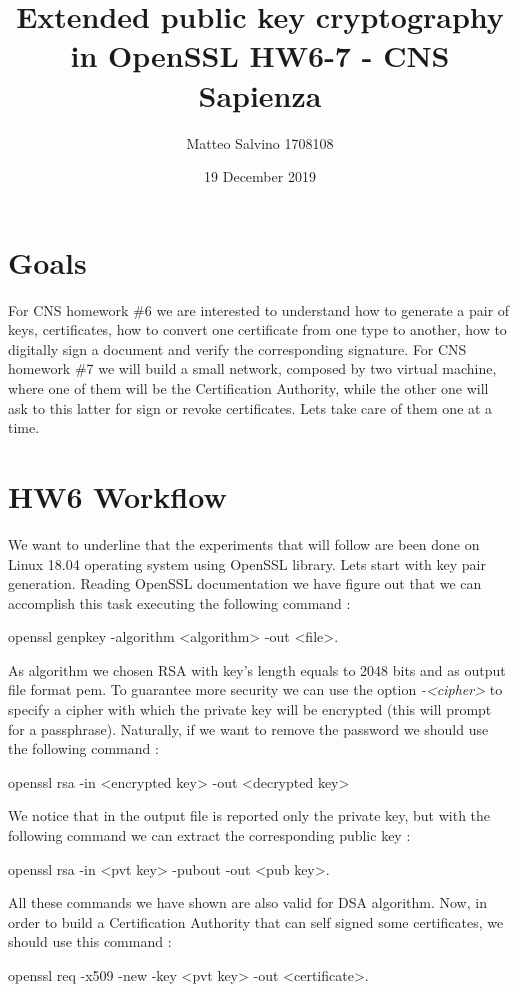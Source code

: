 \documentclass[11pt]{article}
\title{Extended public key cryptography in OpenSSL \large HW6-7 - CNS Sapienza}
\author{Matteo Salvino 1708108}
\date{19 December 2019}
\begin{document}
\maketitle
\section{Goals}
For CNS homework \#6 we are interested to understand how to generate a pair of keys, certificates, how to convert one certificate from one type to another, how to digitally sign a document and verify the corresponding signature. For CNS homework \#7 we will build a small network, composed by two virtual machine, where one of them will be the Certification Authority, while the other one will ask to this latter for sign or revoke certificates. Lets take care of them one at a time.
\section{HW6 Workflow}
We want to underline that the experiments that will follow are been done on Linux 18.04 operating system using OpenSSL library. Lets start with key pair generation. Reading OpenSSL documentation we have figure out that we can accomplish this task executing the following command :
\begin{center}
openssl genpkey -algorithm <algorithm> -out <file>.
\end{center}
As algorithm we chosen RSA with key's length equals to 2048 bits and as output file format pem. To guarantee more security we can use the option \textit{-<cipher>} to specify a cipher with which the private key will be encrypted (this will prompt for a passphrase). Naturally, if we want to remove the password we should use the following command :
\begin{center}
openssl rsa -in <encrypted key> -out <decrypted key>
\end{center} 
We notice that in the output file is reported only the private key, but with the following command we can extract the corresponding public key :
\begin{center}
openssl rsa -in <pvt key> -pubout -out <pub key>.
\end{center}
All these commands we have shown are also valid for DSA algorithm. Now, in order to build a Certification Authority that can self signed some certificates, we should use this command :
\begin{center}
openssl req -x509 -new -key <pvt key> -out <certificate>.
\end{center}
\end{document}
